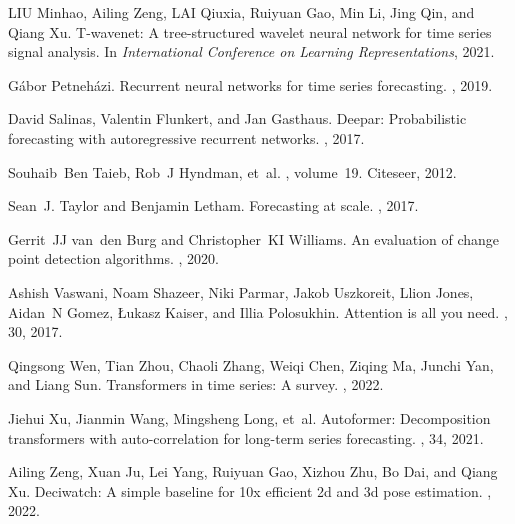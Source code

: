 \documentclass[10pt,twocolumn,letterpaper]{article}
\begin{document}
\begin{thebibliography}{10}
LIU Minhao, Ailing Zeng, LAI Qiuxia, Ruiyuan Gao, Min Li, Jing Qin, and Qiang
  Xu.
\newblock T-wavenet: A tree-structured wavelet neural network for time series
  signal analysis.
\newblock In {\em International Conference on Learning Representations}, 2021.

G{\'a}bor Petneh{\'a}zi.
\newblock Recurrent neural networks for time series forecasting.
, 2019.

David Salinas, Valentin Flunkert, and Jan Gasthaus.
\newblock Deepar: Probabilistic forecasting with autoregressive recurrent
  networks.
, 2017.

Souhaib~Ben Taieb, Rob~J Hyndman, et~al.
, volume~19.
\newblock Citeseer, 2012.

Sean~J. Taylor and Benjamin Letham.
\newblock Forecasting at scale.
, 2017.

Gerrit~JJ van~den Burg and Christopher~KI Williams.
\newblock An evaluation of change point detection algorithms.
, 2020.

Ashish Vaswani, Noam Shazeer, Niki Parmar, Jakob Uszkoreit, Llion Jones,
  Aidan~N Gomez, {\L}ukasz Kaiser, and Illia Polosukhin.
\newblock Attention is all you need.
, 30, 2017.

Qingsong Wen, Tian Zhou, Chaoli Zhang, Weiqi Chen, Ziqing Ma, Junchi Yan, and
  Liang Sun.
\newblock Transformers in time series: A survey.
, 2022.

Jiehui Xu, Jianmin Wang, Mingsheng Long, et~al.
\newblock Autoformer: Decomposition transformers with auto-correlation for
  long-term series forecasting.
, 34, 2021.

Ailing Zeng, Xuan Ju, Lei Yang, Ruiyuan Gao, Xizhou Zhu, Bo Dai, and Qiang Xu.
\newblock Deciwatch: A simple baseline for 10x efficient 2d and 3d pose
  estimation.
, 2022.


\end{thebibliography}
\end{document}
